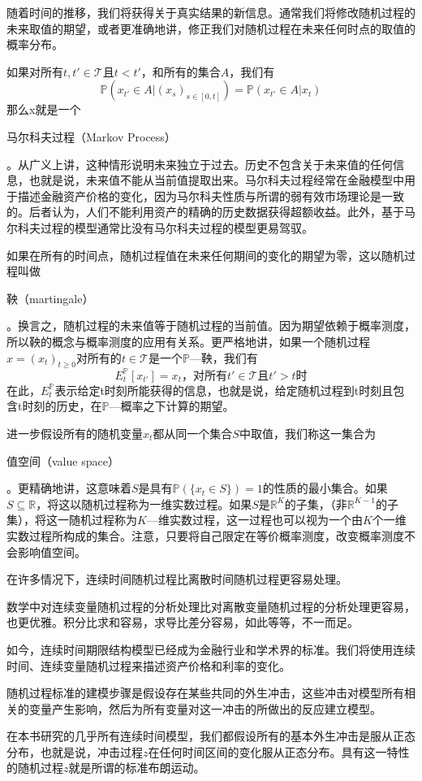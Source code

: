 \documentclass[UTF8]{ctexart}
\newcommand \qd[1] {\begin{qds} {#1} \end{qds}}
\begin{document}
随着时间的推移，我们将获得关于真实结果的新信息。通常我们将修改随机过程的未来取值的期望，或者更准确地讲，修正我们对随机过程在未来任何时点的取值的概率分布。

如果对所有$t,t' \in \mathscr{T} \text{且} t<t'$，和所有的集合$A$，我们有
$$\mathbb{P}(x_{t'} \in A|(x_s)_{s \in [0,t]})=\mathbb{P}(x_{t'} \in A|x_t)$$
那么x就是一个\qd{马尔科夫过程（Markov Process）}。从广义上讲，这种情形说明未来独立于过去。历史不包含关于未来值的任何信息，也就是说，未来值不能从当前值提取出来。马尔科夫过程经常在金融模型中用于描述金融资产价格的变化，因为马尔科夫性质与所谓的弱有效市场理论是一致的。后者认为，人们不能利用资产的精确的历史数据获得超额收益。此外，基于马尔科夫过程的模型通常比没有马尔科夫过程的模型更易驾驭。

如果在所有的时间点，随机过程值在未来任何期间的变化的期望为零，这以随机过程叫做\qd{鞅（martingale）}。换言之，随机过程的未来值等于随机过程的当前值。因为期望依赖于概率测度，所以鞅的概念与概率测度的应用有关系。更严格地讲，如果一个随机过程$x=(x_t)_{t \geqslant 0}$对所有的$t \in \mathscr{T}$是一个$\mathbb{P}$---鞅，我们有
$$E_t^\mathbb{P}[x_{t'}]=x_t \text{，对所有}t' \in \mathscr{T} \text{且} t'>t \text{时}$$
在此，$E_t^\mathbb{P}$表示给定t时刻所能获得的信息，也就是说，给定随机过程到t时刻且包含t时刻的历史，在$\mathbb{P}$---概率之下计算的期望。

进一步假设所有的随机变量$x_t$都从同一个集合$S$中取值，我们称这一集合为\qd{值空间（value space）}。更精确地讲，这意味着$S$是具有$\mathbb{P}(\{x_t \in S\})=1$的性质的最小集合。如果$S \subseteq \mathbb{R}$，将这以随机过程称为一维实数过程。如果$S$是$\mathbb{R}^K$的子集，（非$\mathbb{R}^{K-1}$的子集），将这一随机过程称为$K$---维实数过程，这一过程也可以视为一个由$K$个一维实数过程所构成的集合。注意，只要将自己限定在等价概率测度，改变概率测度不会影响值空间。

在许多情况下，连续时间随机过程比离散时间随机过程更容易处理。

数学中对连续变量随机过程的分析处理比对离散变量随机过程的分析处理更容易，也更优雅。积分比求和容易，求导比差分容易，如此等等，不一而足。

如今，连续时间期限结构模型已经成为金融行业和学术界的标准。我们将使用连续时间、连续变量随机过程来描述资产价格和利率的变化。

随机过程标准的建模步骤是假设存在某些共同的外生冲击，这些冲击对模型所有相关的变量产生影响，然后为所有变量对这一冲击的所做出的反应建立模型。

在本书研究的几乎所有连续时间模型，我们都假设所有的基本外生冲击是服从正态分布，也就是说，冲击过程$z$在任何时间区间的变化服从正态分布。具有这一特性的随机过程$z$就是所谓的标准布朗运动。
\end{document}
